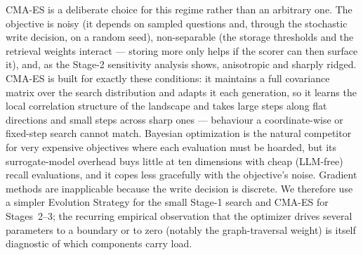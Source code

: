 CMA-ES is a deliberate choice for this regime rather than an arbitrary one. The
objective is noisy (it depends on sampled questions and, through the stochastic
write decision, on a random seed), non-separable (the storage thresholds and the
retrieval weights interact --- storing more only helps if the scorer can then
surface it), and, as the Stage-2 sensitivity analysis shows, anisotropic and
sharply ridged. CMA-ES is built for exactly these conditions: it maintains a full
covariance matrix over the search distribution and adapts it each generation, so
it learns the local correlation structure of the landscape and takes large steps
along flat directions and small steps across sharp ones --- behaviour a
coordinate-wise or fixed-step search cannot match. Bayesian optimization is the
natural competitor for very expensive objectives where each evaluation must be
hoarded, but its surrogate-model overhead buys little at ten dimensions with
cheap (LLM-free) recall evaluations, and it copes less gracefully with the
objective's noise. Gradient methods are inapplicable because the write decision is
discrete. We therefore use a simpler Evolution Strategy for the small Stage-1
search and CMA-ES for Stages~2--3; the recurring empirical observation that the
optimizer drives several parameters to a boundary or to zero (notably the
graph-traversal weight) is itself diagnostic of which components carry load.

